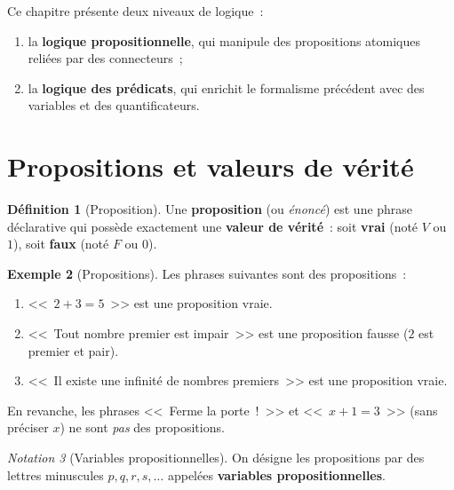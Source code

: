 \documentclass[12pt,a4paper,openany]{book}
\theoremstyle{definition}
\newtheorem{definition}{Définition}[chapter]
\newtheorem{exemple}[definition]{Exemple}
\theoremstyle{plain}
\theoremstyle{remark}
\newtheorem{notation}[definition]{Notation}
\begin{document}
Ce chapitre pr\'esente deux niveaux de logique~:
\begin{enumerate}[label=(\roman*)]
  \item la \textbf{logique propositionnelle}, qui manipule des propositions atomiques reli\'ees par des connecteurs~;
  \item la \textbf{logique des pr\'edicats}, qui enrichit le formalisme pr\'ec\'edent avec des variables et des quantificateurs.
\end{enumerate}

\section{Propositions et valeurs de v\'erit\'e}
\label{sec:propositions}

\begin{definition}[Proposition]\label{def:proposition}
  Une \textbf{proposition} (ou \emph{\'enonc\'e}) est une phrase d\'eclarative qui poss\`ede exactement une \textbf{valeur de v\'erit\'e}~: soit \textbf{vrai} (not\'e $V$ ou $1$), soit \textbf{faux} (not\'e $F$ ou $0$).
\end{definition}

\begin{exemple}[Propositions]\label{ex:propositions}
  Les phrases suivantes sont des propositions~:
  \begin{enumerate}[label=(\alph*)]
    \item <<~$2 + 3 = 5$~>> est une proposition vraie.
    \item <<~Tout nombre premier est impair~>> est une proposition fausse ($2$ est premier et pair).
    \item <<~Il existe une infinit\'e de nombres premiers~>> est une proposition vraie.
  \end{enumerate}
  En revanche, les phrases <<~Ferme la porte~!~>> et <<~$x + 1 = 3$~>> (sans pr\'eciser $x$) ne sont \emph{pas} des propositions.
\end{exemple}

\begin{notation}[Variables propositionnelles]\label{not:var-prop}
  On d\'esigne les propositions par des lettres minuscules $p, q, r, s, \dots$ appel\'ees \textbf{variables propositionnelles}.
\end{notation}
\end{document}
